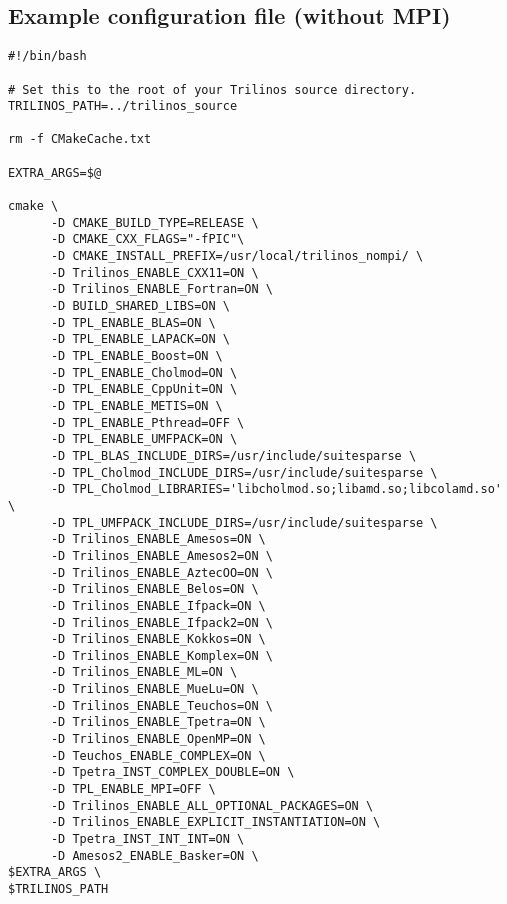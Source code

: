 \subsection{Example configuration file (without MPI)}
\begin{verbatim}
#!/bin/bash

# Set this to the root of your Trilinos source directory.
TRILINOS_PATH=../trilinos_source

rm -f CMakeCache.txt

EXTRA_ARGS=$@

cmake \
      -D CMAKE_BUILD_TYPE=RELEASE \
      -D CMAKE_CXX_FLAGS="-fPIC"\
      -D CMAKE_INSTALL_PREFIX=/usr/local/trilinos_nompi/ \
      -D Trilinos_ENABLE_CXX11=ON \
      -D Trilinos_ENABLE_Fortran=ON \
      -D BUILD_SHARED_LIBS=ON \
      -D TPL_ENABLE_BLAS=ON \
      -D TPL_ENABLE_LAPACK=ON \
      -D TPL_ENABLE_Boost=ON \
      -D TPL_ENABLE_Cholmod=ON \
      -D TPL_ENABLE_CppUnit=ON \
      -D TPL_ENABLE_METIS=ON \
      -D TPL_ENABLE_Pthread=OFF \
      -D TPL_ENABLE_UMFPACK=ON \
      -D TPL_BLAS_INCLUDE_DIRS=/usr/include/suitesparse \
      -D TPL_Cholmod_INCLUDE_DIRS=/usr/include/suitesparse \
      -D TPL_Cholmod_LIBRARIES='libcholmod.so;libamd.so;libcolamd.so' \
      -D TPL_UMFPACK_INCLUDE_DIRS=/usr/include/suitesparse \
      -D Trilinos_ENABLE_Amesos=ON \
      -D Trilinos_ENABLE_Amesos2=ON \
      -D Trilinos_ENABLE_AztecOO=ON \
      -D Trilinos_ENABLE_Belos=ON \
      -D Trilinos_ENABLE_Ifpack=ON \
      -D Trilinos_ENABLE_Ifpack2=ON \
      -D Trilinos_ENABLE_Kokkos=ON \
      -D Trilinos_ENABLE_Komplex=ON \
      -D Trilinos_ENABLE_ML=ON \
      -D Trilinos_ENABLE_MueLu=ON \
      -D Trilinos_ENABLE_Teuchos=ON \
      -D Trilinos_ENABLE_Tpetra=ON \
      -D Trilinos_ENABLE_OpenMP=ON \
      -D Teuchos_ENABLE_COMPLEX=ON \
      -D Tpetra_INST_COMPLEX_DOUBLE=ON \
      -D TPL_ENABLE_MPI=OFF \
      -D Trilinos_ENABLE_ALL_OPTIONAL_PACKAGES=ON \
      -D Trilinos_ENABLE_EXPLICIT_INSTANTIATION=ON \
      -D Tpetra_INST_INT_INT=ON \
      -D Amesos2_ENABLE_Basker=ON \
$EXTRA_ARGS \
$TRILINOS_PATH
\end{verbatim}


